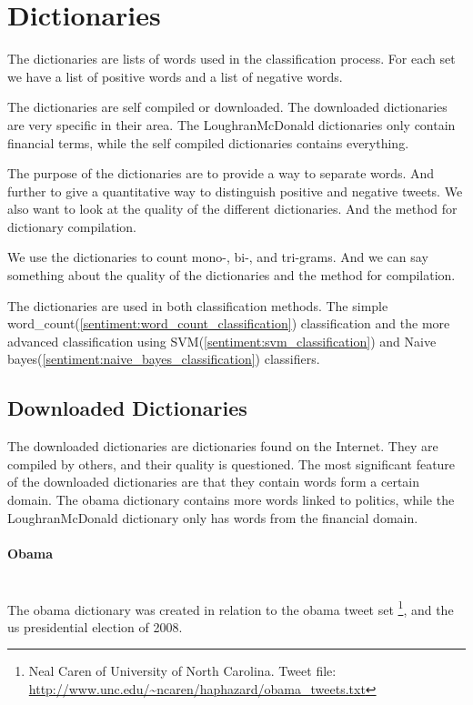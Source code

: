 \section{Dictionaries}\label{data:dictionaries}

The dictionaries are lists of words used in the classification process. For
each set we have a list of positive words and a list of negative words. 

The dictionaries are self compiled or downloaded. The downloaded dictionaries
are very specific in their area. The LoughranMcDonald dictionaries only contain
financial terms, while the self compiled dictionaries contains everything. 

The purpose of the dictionaries are to provide a way to separate words. And
further to give a quantitative way to distinguish positive and negative tweets.
We also want to look at the quality of the different dictionaries. And the
method for dictionary compilation.  

We use the dictionaries to count mono-, bi-, and tri-grams.
And we can say something about the quality of the dictionaries and the method
for compilation.

The dictionaries are used in both classification methods. The simple
word\_count(\ref{sentiment:word_count_classification}) classification and the
more advanced classification using SVM(\ref{sentiment:svm_classification}) and
Naive bayes(\ref{sentiment:naive_bayes_classification}) classifiers. 
%

\subsection{Downloaded Dictionaries}
The downloaded dictionaries are dictionaries found on the Internet. They are
compiled by others, and their quality is questioned. The most significant
feature of the downloaded dictionaries are that they contain words form a
certain domain. The obama dictionary contains more words linked to politics,
while the LoughranMcDonald dictionary only has words from the financial domain.  

\paragraph{Obama}
\hspace{0pt}\\
The obama dictionary was created in relation to the obama tweet set
\footnote{Neal Caren of University of North Carolina. Tweet file:
\url{http://www.unc.edu/~ncaren/haphazard/obama_tweets.txt}}, and the us
presidential election of 2008.

